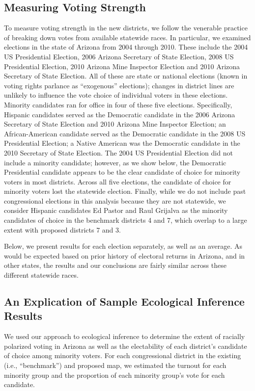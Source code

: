 \documentclass[12pt]{article}
\begin{document}
\subsection{Measuring Voting Strength}

To measure voting strength in the new districts, we follow the
venerable practice of breaking down votes from available statewide
races.  In particular, we examined elections in the state of Arizona
from 2004 through 2010. These include the 2004 US Presidential
Election, 2006 Arizona Secretary of State Election, 2008 US
Presidential Election, 2010 Arizona Mine Inspector Election and 2010
Arizona Secretary of State Election.  All of these are state or
national elections (known in voting rights parlance as ``exogenous''
elections); changes in district lines are unlikely to influence the
vote choice of individual voters in these elections. Minority
candidates ran for office in four of these five elections.
Specifically, Hispanic candidates served as the Democratic candidate
in the 2006 Arizona Secretary of State Election and 2010 Arizona Mine
Inspector Election; an African-American candidate served as the
Democratic candidate in the 2008 US Presidential Election; a Native
American was the Democratic candidate in the 2010 Secretary of State
Election. The 2004 US Presidential Election did not include a minority
candidate; however, as we show below, the Democratic Presidential
candidate appears to be the clear candidate of choice for minority
voters in most districts. Across all five elections, the candidate of choice for minority voters lost the statewide election. Finally, while we do not include past congressional elections in this analysis because they are not statewide, we consider Hispanic candidates Ed Pastor and Raul Grijalva as the minority candidates of choice in the benchmark districts 4 and 7, which overlap to a large extent with proposed districts 7 and 3. 

Below, we present results for each election separately, as well as an
average.  As would be expected based on prior history of electoral
returns in Arizona, and in other states, the results and our
conclusions are fairly similar across these different statewide races.

\subsection{An Explication of Sample Ecological Inference Results}

We used our approach to ecological inference to determine the extent
of racially polarized voting in Arizona as well as the electability of
each district's candidate of choice among minority voters. For each
congressional district in the existing (i.e., ``benchmark'') and
proposed map, we estimated the turnout for each minority group and the
proportion of each minority group's vote for each candidate. 
\end{document}
